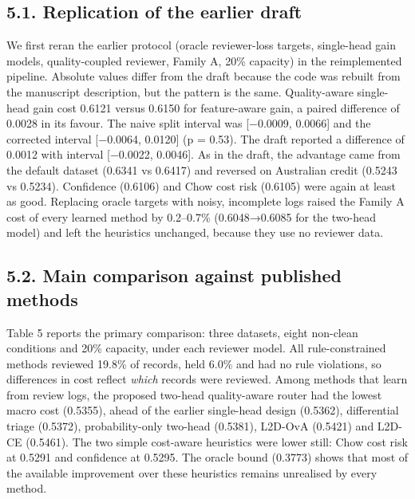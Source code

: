 \documentclass[
  11pt,
]{article}
\begin{document}
\hypertarget{replication-of-the-earlier-draft}{%
\subsection{5.1. Replication of the earlier
draft}\label{replication-of-the-earlier-draft}}

We first reran the earlier protocol (oracle reviewer-loss targets,
single-head gain models, quality-coupled reviewer, Family A, 20\%
capacity) in the reimplemented pipeline. Absolute values differ from the
draft because the code was rebuilt from the manuscript description, but
the pattern is the same. Quality-aware single-head gain cost 0.6121
versus 0.6150 for feature-aware gain, a paired difference of 0.0028 in
its favour. The naive split interval was {[}−0.0009, 0.0066{]} and the
corrected interval {[}−0.0064, 0.0120{]} (p = 0.53). The draft reported
a difference of 0.0012 with interval {[}−0.0022, 0.0046{]}. As in the
draft, the advantage came from the default dataset (0.6341 vs 0.6417)
and reversed on Australian credit (0.5243 vs 0.5234). Confidence
(0.6106) and Chow cost risk (0.6105) were again at least as good.
Replacing oracle targets with noisy, incomplete logs raised the Family A
cost of every learned method by 0.2--0.7\% (0.6048→0.6085 for the
two-head model) and left the heuristics unchanged, because they use no
reviewer data.

\hypertarget{main-comparison-against-published-methods}{%
\subsection{5.2. Main comparison against published
methods}\label{main-comparison-against-published-methods}}

Table 5 reports the primary comparison: three datasets, eight non-clean
conditions and 20\% capacity, under each reviewer model. All
rule-constrained methods reviewed 19.8\% of records, held 6.0\% and had
no rule violations, so differences in cost reflect \emph{which} records
were reviewed. Among methods that learn from review logs, the proposed
two-head quality-aware router had the lowest macro cost (0.5355), ahead
of the earlier single-head design (0.5362), differential triage
(0.5372), probability-only two-head (0.5381), L2D-OvA (0.5421) and
L2D-CE (0.5461). The two simple cost-aware heuristics were lower still:
Chow cost risk at 0.5291 and confidence at 0.5295. The oracle bound
(0.3773) shows that most of the available improvement over these
heuristics remains unrealised by every method.
\end{document}
